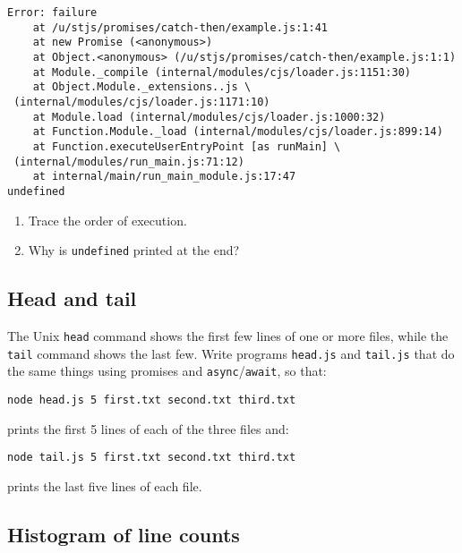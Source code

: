 \documentclass[krantzl]{krantz}
\begin{document}
\begin{lstlisting}[frame=single,frameround=tttt]
Error: failure
    at /u/stjs/promises/catch-then/example.js:1:41
    at new Promise (<anonymous>)
    at Object.<anonymous> (/u/stjs/promises/catch-then/example.js:1:1)
    at Module._compile (internal/modules/cjs/loader.js:1151:30)
    at Object.Module._extensions..js \
 (internal/modules/cjs/loader.js:1171:10)
    at Module.load (internal/modules/cjs/loader.js:1000:32)
    at Function.Module._load (internal/modules/cjs/loader.js:899:14)
    at Function.executeUserEntryPoint [as runMain] \
 (internal/modules/run_main.js:71:12)
    at internal/main/run_main_module.js:17:47
undefined
\end{lstlisting}


\begin{enumerate}

\item Trace the order of execution.

\item Why is \texttt{undefined} printed at the end?

\end{enumerate}

\subsection*{Head and tail}


The Unix \texttt{head} command shows the first few lines of one or more files,
while the \texttt{tail} command shows the last few.
Write programs \texttt{head.js} and \texttt{tail.js} that do the same things using promises and \texttt{async}/\texttt{await},
so that:

\begin{lstlisting}[frame=single,frameround=tttt]
node head.js 5 first.txt second.txt third.txt
\end{lstlisting}


\noindent prints the first 5 lines of each of the three files and:

\begin{lstlisting}[frame=single,frameround=tttt]
node tail.js 5 first.txt second.txt third.txt
\end{lstlisting}


\noindent prints the last five lines of each file.

\subsection*{Histogram of line counts}
\end{document}
